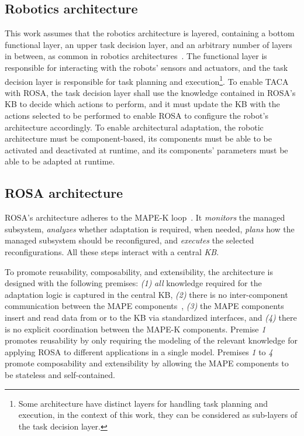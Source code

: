 \subsection{Robotics architecture}
This work assumes that the robotics architecture is layered, containing a bottom functional layer, an upper task decision layer, and an arbitrary number of layers in between, as common in robotics architectures~\citep{barnett2022architectural}. The functional layer is responsible for interacting with the robots' sensors and actuators, and the task decision layer is responsible for task planning and execution\footnote{Some architecture have distinct layers for handling task planning and execution, in the context of this work, they can be considered as sub-layers of the task decision layer.}. To enable TACA with ROSA, the task decision layer shall use the knowledge contained in ROSA's KB to decide which actions to perform, and it must update the KB with the actions selected to be performed to enable ROSA to configure the robot's architecture accordingly. To enable architectural adaptation, the robotic architecture must be component-based, its components must be able to be activated and deactivated at runtime, and its components' parameters must be able to be adapted at runtime.

\subsection{ROSA architecture}
ROSA's architecture adheres to the MAPE-K loop~\citep{kepharTheVision2003}. It \emph{monitors} the managed subsystem, \emph{analyzes} whether adaptation is required, when needed, \emph{plans} how the managed subsystem should be reconfigured, and \emph{executes} the selected reconfigurations. All these steps interact with a central \emph{KB}.

To promote reusability, composability, and extensibility, the architecture is designed with the following premises: \emph{(1)} \emph{all} knowledge required for the adaptation logic is captured in the central KB, \emph{(2)} there is no inter-component communication between the MAPE components~\citep{weyns_patterns_2013}, \emph{(3)} the MAPE components insert and read data from or to the KB via standardized interfaces, and \emph{(4)} there is no explicit coordination between the MAPE-K components. Premise \emph{1} promotes reusability by only requiring the modeling of the relevant knowledge for applying ROSA to different applications in a single model. Premises \emph{1} to \emph{4} promote composability and extensibility by allowing the MAPE components to be stateless and self-contained.

